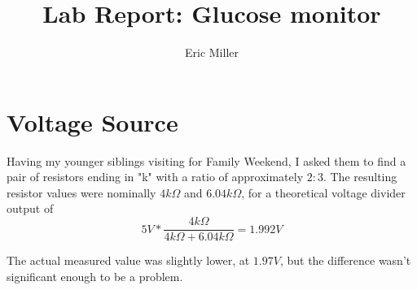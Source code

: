 \documentclass[11pt]{article} %
\title{Lab Report: Glucose monitor}
\author{Eric Miller}
\begin{document}
\maketitle %


\section{Voltage Source}

Having my younger siblings visiting for Family Weekend, I asked them to find a pair of resistors ending in "k" with a ratio of approximately $2:3$. The resulting resistor values were nominally $4 k\Omega$ and $6.04 k\Omega$, for a theoretical voltage divider output of 
$$5V*\frac {4 k\Omega} {4 k\Omega + 6.04 k\Omega} = 1.992 V$$

The actual measured value was slightly lower, at $1.97V$, but the difference wasn't significant enough to be a problem.

\end{document}
